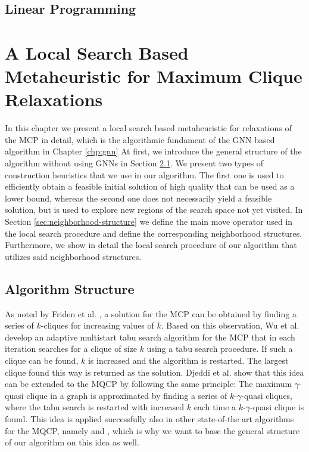\documentclass[draft,final]{vutinfth} %
\begin{document}
\section{Linear Programming}


\chapter{A Local Search Based Metaheuristic for Maximum Clique Relaxations}\label{chp:local-search-algorithm}


In this chapter we present a local search based metaheuristic for relaxations of the MCP in detail, which is the algorithmic fundament of the GNN based algorithm in Chapter \ref{chp:gnn}
At first, we introduce the general structure of the algorithm without using GNNs in Section \ref{sec:algorithm-structure}. We present two types of construction heuristics that we use in our algorithm. The first one is used to efficiently obtain a feasible initial solution of high quality that can be used as a lower bound, whereas the second one does not necessarily yield a feasible solution, but is used to explore new regions of the search space not yet visited. In Section \ref{sec:neighborhood-structure} we define the main move operator used in the local search procedure and define the corresponding neighborhood structures. Furthermore, we show in detail the local search procedure of our algorithm that utilizes said neighborhood structures. 

\section{Algorithm Structure} \label{sec:algorithm-structure}

As noted by Friden et al. \cite{Friden1989}, a solution for the MCP can be obtained by finding a series of $k$-cliques for increasing values of $k$. Based on this observation, Wu et al. \cite{WuH13} develop an adaptive multistart tabu search algorithm for the MCP that in each iteration searches for a clique of size $k$ using a tabu search procedure. If such a clique can be found, $k$ is increased and the algorithm is restarted. The largest clique found this way is returned as the solution. Djeddi et al. \cite{djeddi_extension_2019} show that this idea can be extended to the MQCP by following the same principle: The maximum $\gamma$-quasi clique in a graph is approximated by finding a series of $k$-$\gamma$-quasi cliques, where the tabu search is restarted with increased $k$ each time a $k$-$\gamma$-quasi clique is found. This idea is applied successfully also in other state-of-the art algorithms for the MQCP, namely \cite{zhou_opposition-based_2020} and \cite{chen_nuqclq_2021}, which is why we want to base the general structure of our algorithm on this idea as well. 
\end{document}
